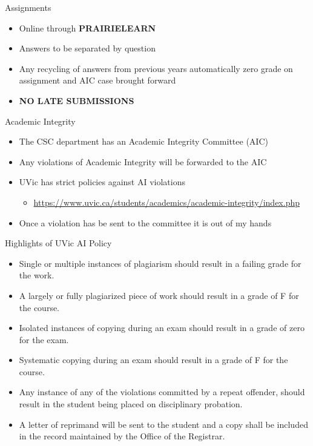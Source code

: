 \documentclass[12pt]{beamer}
\begin{document}
\begin{frame}{Assignments}
\begin{itemize} 
\item{Online through {\bf PRAIRIELEARN}}
\item{Answers to be separated by question}
\item{Any recycling of answers from previous 
years automatically zero grade on assignment and AIC case brought forward} 
\item{{\bf NO LATE SUBMISSIONS}}
\end{itemize}

\end{frame}

\begin{frame}{Academic Integrity}
\begin{itemize} 
\item{The CSC department has an Academic Integrity Committee (AIC)}
\item{Any violations of Academic Integrity will be forwarded to the AIC}
\item{UVic has strict policies against AI violations}
\begin{itemize}
\item{\url{https://www.uvic.ca/students/academics/academic-integrity/index.php}}
\end{itemize}
\item{Once a violation has be sent to the committee it is out of my hands}
\end{itemize}
\end{frame}

\begin{frame}{Highlights of UVic AI Policy}
\begin{itemize} 
\item{Single or multiple instances of plagiarism should result in a failing grade for the work.}
\item{A largely or fully plagiarized piece of work should result in a grade of F for the course.}
\item{Isolated instances of copying during an exam should result in a grade of zero for the exam.}
\item{Systematic copying during an exam should result in a grade of F for the course.}
\item{Any instance of any of the violations committed by a repeat offender, should result in the student being placed on disciplinary probation.}
\item{A letter of reprimand will be sent to the student and a copy shall be included in the record maintained by the Office of the Registrar.}
\end{itemize}
\end{frame}
\end{document}
